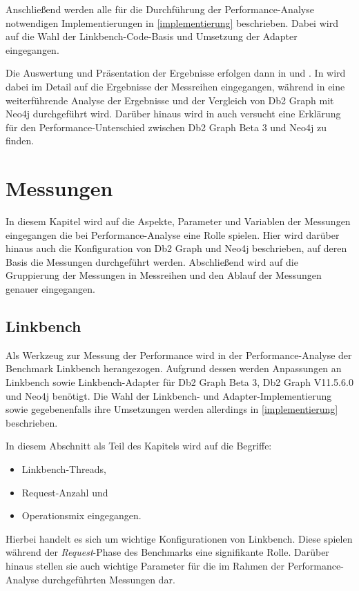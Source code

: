Anschließend werden alle für die Durchführung der Performance-Analyse notwendigen Implementierungen in \autoref{implementierung} beschrieben. Dabei wird auf die Wahl der Linkbench-Code-Basis und Umsetzung der Adapter eingegangen. 

Die Auswertung und Präsentation der Ergebnisse erfolgen dann in  und . In  wird dabei im Detail auf die Ergebnisse der Messreihen eingegangen, während in  eine weiterführende Analyse der Ergebnisse und der Vergleich von Db2 Graph mit Neo4j durchgeführt wird. Darüber hinaus wird in  auch versucht eine Erklärung für den Performance-Unterschied zwischen Db2 Graph Beta 3 und Neo4j zu finden. 

\chapter{Messungen}
\label{messungen}
In diesem Kapitel wird auf die Aspekte, Parameter und Variablen der Messungen eingegangen die bei Performance-Analyse eine Rolle spielen. Hier wird darüber hinaus auch die Konfiguration von Db2 Graph und Neo4j beschrieben, auf deren Basis die Messungen durchgeführt werden. Abschließend wird auf die Gruppierung der Messungen in Messreihen und den Ablauf der Messungen genauer eingegangen.  

\section{Linkbench}
Als Werkzeug zur Messung der Performance wird in der Performance-Analyse der Benchmark Linkbench herangezogen. Aufgrund dessen werden Anpassungen an Linkbench  sowie Linkbench-Adapter für Db2 Graph Beta 3, Db2 Graph V11.5.6.0 und Neo4j benötigt. Die Wahl der Linkbench- und Adapter-Implementierung sowie gegebenenfalls ihre Umsetzungen werden allerdings in \autoref{implementierung} beschrieben. 

In diesem Abschnitt als Teil des Kapitels  wird auf die Begriffe: 
\begin{itemize}
    \item Linkbench-Threads,
    \item Request-Anzahl und
    \item Operationsmix eingegangen.
\end{itemize}
Hierbei handelt es sich um wichtige Konfigurationen von Linkbench. Diese spielen während der \textit{Request}-Phase des Benchmarks eine signifikante Rolle. Darüber hinaus stellen sie auch wichtige Parameter für die im Rahmen der Performance-Analyse durchgeführten Messungen dar. 

